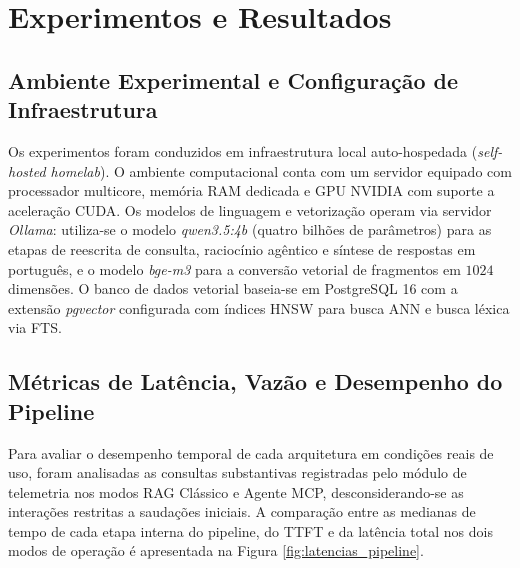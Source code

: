 \documentclass[12pt]{article}
\begin{document}
\section{Experimentos e Resultados}\label{sec:resultados}

\subsection{Ambiente Experimental e Configuração de Infraestrutura}

Os experimentos foram conduzidos em infraestrutura local auto-hospedada (\textit{self-hosted homelab}). O ambiente computacional conta com um servidor equipado com processador multicore, memória RAM dedicada e GPU NVIDIA com suporte a aceleração CUDA. Os modelos de linguagem e vetorização operam via servidor \textit{Ollama}: utiliza-se o modelo \textit{qwen3.5:4b} (quatro bilhões de parâmetros) para as etapas de reescrita de consulta, raciocínio agêntico e síntese de respostas em português, e o modelo \textit{bge-m3} para a conversão vetorial de fragmentos em $1024$ dimensões. O banco de dados vetorial baseia-se em PostgreSQL 16 com a extensão \textit{pgvector} configurada com índices HNSW para busca ANN e busca léxica via FTS.

\subsection{Métricas de Latência, Vazão e Desempenho do Pipeline}

Para avaliar o desempenho temporal de cada arquitetura em condições reais de uso, foram analisadas as consultas substantivas registradas pelo módulo de telemetria nos modos RAG Clássico e Agente MCP, desconsiderando-se as interações restritas a saudações iniciais. A comparação entre as medianas de tempo de cada etapa interna do pipeline, do TTFT e da latência total nos dois modos de operação é apresentada na Figura \ref{fig:latencias_pipeline}.
\end{document}
